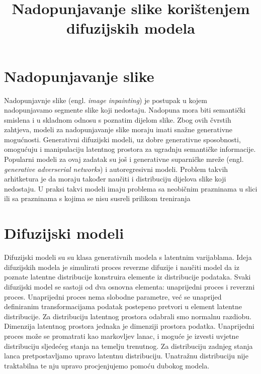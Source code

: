 \documentclass[10pt, a4paper, croatian]{article}
\title{Nadopunjavanje slike korištenjem difuzijskih modela}
\begin{document}
\maketitleabstract

\section{Nadopunjavanje slike}
Nadopunjavnje slike (engl. \emph{image inpainting}) je postupak u kojem nadopunjavamo segmente slike koji nedostaju. Nadopuna mora biti 
semantički smislena i u skladnom odnosu s poznatim dijelom slike. Zbog ovih čvrstih zahtjeva, modeli za nadopunjavanje slike moraju imati 
snažne generativne mogućnosti. Generativni difuzijski modeli, uz dobre generativne sposobnosti, omogućuju i manipulaciju latentnog prostora 
za ugradnju semantičke informacije. Popularni modeli za ovaj zadatak su još i generativne suparničke mreže 
(engl. \emph{generative adverserial networks}) i autoregresivni modeli. Problem takvih arhitketura je da moraju također naučiti i distribuciju
dijelova slike koji nedostaju. U praksi takvi modeli imaju problema sa neobičnim prazninama u slici ili sa prazninama s kojima se nisu
susreli prilikom treniranja


\section{Difuzijski modeli}
Difuzijski modeli su su klasa generativnih modela s latentnim varijablama. Ideja difuzijskih modela je simulirati proces reverzne difuzije 
i naučiti model da iz poznate latentne distribucije konstruira elemente iz distribucije podataka. Svaki difuzijski model se sastoji od dva
osnovna elementa: unaprijedni proces i reverzni proces. Unaprijedni proces nema slobodne parametre, već se unaprijed definiranim 
transformacijama podatak postepeno pretvori u element latentne distribucije. Za distribuciju latentnog prostora odabrali smo normalnu razdiobu.
Dimenzija latentnog prostora jednaka je dimenziji prostora podatka. Unaprijedni proces može se promatrati kao markovljev lanac, i moguće je 
izvesti uvjetne distribuciju sljedećeg stanja na temelju trenutnog. Za distribuciju zadnjeg stanja lanca pretpostavljamo upravo latentnu 
distribuciju. Unatražnu distribuciju nije traktabilna te nju upravo procjenjujemo pomoću dubokog modela. 
\end{document}
